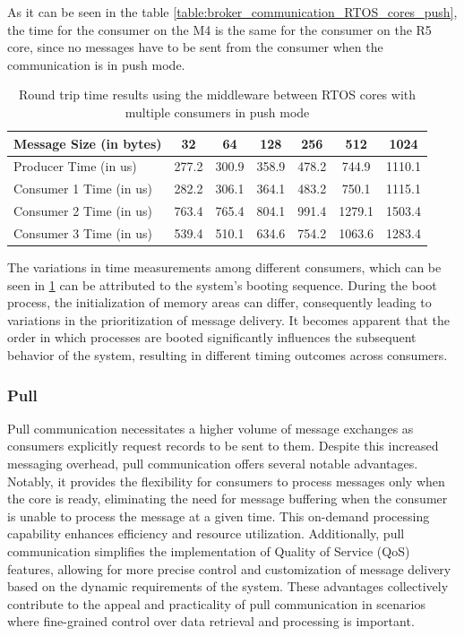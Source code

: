 As it can be seen in the table \ref{table:broker_communication_RTOS_cores_push},
the time for the consumer on the M4 is the same for the consumer on the R5 core,
since no messages have to be sent from the consumer when the communication is
in push mode.

\begin{table}[H]
\centering
\caption{Round trip time results using the middleware between RTOS cores with
         multiple consumers in push mode}
\label{table:broker_communication_RTOS_cores_multiple_consumers_push}
\begin{tabular}{lcccccc}
\toprule
Message Size (in bytes) & 32 & 64 & 128 & 256 & 512 & 1024 \\
\midrule
Producer Time (in us) & 277.2 & 300.9 & 358.9 & 478.2 & 744.9 & 1110.1 \\
Consumer 1 Time (in us) & 282.2 & 306.1 & 364.1 & 483.2 & 750.1 & 1115.1 \\
Consumer 2 Time (in us) & 763.4 & 765.4 & 804.1 & 991.4 & 1279.1 & 1503.4 \\
Consumer 3 Time (in us) & 539.4 & 510.1 & 634.6 & 754.2 & 1063.6 & 1283.4 \\
\bottomrule
\end{tabular}
\end{table}

The variations in time measurements among different consumers, which can be
seen in \ref{table:broker_communication_RTOS_cores_multiple_consumers_push}
can be attributed to the system's booting sequence.
During the boot process, the initialization of memory areas can differ,
consequently leading to variations in the prioritization of message delivery.
It becomes apparent that the order in which processes are booted significantly
influences the subsequent behavior of the system, resulting in different timing
outcomes across consumers.

\subsubsection{Pull}

Pull communication necessitates a higher volume of message exchanges as
consumers explicitly request records to be sent to them.
Despite this increased messaging overhead, pull communication offers several
notable advantages. Notably, it provides the flexibility for consumers to
process messages only when the core is ready, eliminating the need for message
buffering when the consumer is unable to process the message at a given time.
This on-demand processing capability enhances efficiency and resource
utilization. Additionally, pull communication simplifies the implementation
of Quality of Service (QoS) features, allowing for more precise control and
customization of message delivery based on the dynamic requirements of the
system. These advantages collectively contribute to the appeal and practicality
of pull communication in scenarios where fine-grained control over data
retrieval and processing is important. 

